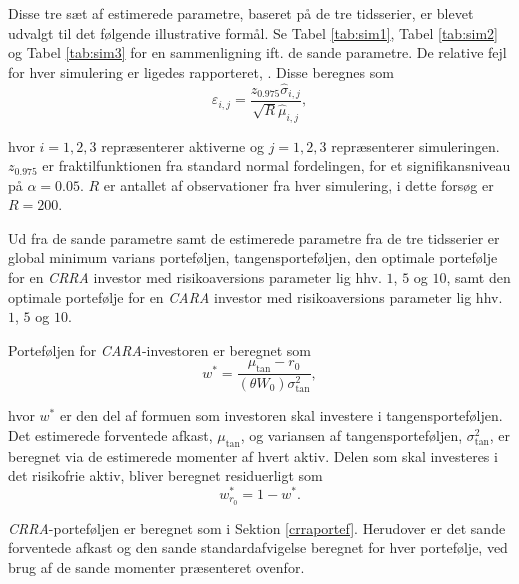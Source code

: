 \documentclass[
  a4paper,
  oneside]{memoir}
\begin{document}
Disse tre sæt af estimerede parametre, baseret på de tre tidsserier, er blevet udvalgt til det følgende illustrative formål. Se Tabel \ref{tab:sim1}, Tabel \ref{tab:sim2} og Tabel \ref{tab:sim3} for en sammenligning ift. de sande parametre. De relative fejl for hver simulering er ligedes rapporteret, \citep{Asmussen2007}. Disse beregnes som
\[\varepsilon_{i,j} = \frac{z_{0.975}\hat{\sigma}_{i,j}}{\sqrt{R}\hat{\mu}_{i,j}},\]

hvor \(i=1,2,3\) repræsenterer aktiverne og \(j=1,2,3\) repræsenterer simuleringen. \(z_{0.975}\) er fraktilfunktionen fra standard normal fordelingen, for et signifikansniveau på \(\alpha=0.05\). \(R\) er antallet af observationer fra hver simulering, i dette forsøg er \(R=200\).

Ud fra de sande parametre samt de estimerede parametre fra de tre tidsserier er global minimum varians porteføljen, tangensporteføljen, den optimale portefølje for en \emph{CRRA} investor med risikoaversions parameter lig hhv. \(1\), \(5\) og \(10\), samt den optimale portefølje for en \emph{CARA} investor med risikoaversions parameter lig hhv. \(1\), \(5\) og \(10\).

Porteføljen for \emph{CARA}-investoren er beregnet som
\[w^*=\frac{\mu_{\text{tan}}-r_0}{(\theta W_0)\sigma_{\text{tan}}^2},\]

hvor \(w^*\) er den del af formuen som investoren skal investere i tangensporteføljen. Det estimerede forventede afkast, \(\mu_{\text{tan}}\), og variansen af tangensporteføljen, \(\sigma_{\text{tan}}^2\), er beregnet via de estimerede momenter af hvert aktiv. Delen som skal investeres i det risikofrie aktiv, bliver beregnet residuerligt som
\[w_{r_0}^*=1-w^*.\]

\emph{CRRA}-porteføljen er beregnet som i Sektion \ref{crraportef}. Herudover er det sande forventede afkast og den sande standardafvigelse beregnet for hver portefølje, ved brug af de sande momenter præsenteret ovenfor.
\end{document}
